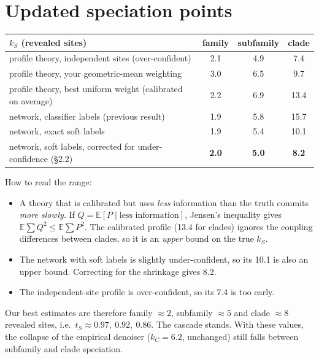 \documentclass[11pt,a4paper]{article}
\newcommand{\E}{\mathbb{E}}
\begin{document}
\section{Updated speciation points}
\begin{center}\small
\begin{tabular}{lccc}
\toprule
$k_S$ (revealed sites) & family & subfamily & clade\\
\midrule
profile theory, independent sites (over-confident) & 2.1 & 4.9 & 7.4\\
profile theory, your geometric-mean weighting & 3.0 & 6.5 & 9.7\\
profile theory, best uniform weight (calibrated on average) & 2.2 & 6.9 & 13.4\\
network, classifier labels (previous result) & 1.9 & 5.8 & 15.7\\
network, exact soft labels & 1.9 & 5.4 & 10.1\\
network, soft labels, corrected for under-confidence (\S2.2) & \textbf{2.0} & \textbf{5.0} & \textbf{8.2}\\
\bottomrule
\end{tabular}
\end{center}
How to read the range:
\begin{itemize}[nosep]
\item A theory that is calibrated but uses \emph{less} information than the truth commits \emph{more slowly}. If
$Q=\E[P\mid\text{less information}]$, Jensen's inequality gives $\E\sum Q^2\le\E\sum P^2$. The calibrated profile
(13.4 for clades) ignores the coupling differences between clades, so it is an \emph{upper} bound on the true $k_S$.
\item The network with soft labels is slightly under-confident, so its 10.1 is also an upper bound. Correcting for the
shrinkage gives 8.2.
\item The independent-site profile is over-confident, so its 7.4 is too early.
\end{itemize}
Our best estimates are therefore family $\approx2$, subfamily $\approx5$ and clade $\approx8$ revealed sites, i.e.\
$t_S\approx0.97,\ 0.92,\ 0.86$. The cascade stands. With these values, the collapse of the empirical denoiser
($k_C=6.2$, unchanged) still falls between subfamily and clade speciation.
\end{document}
